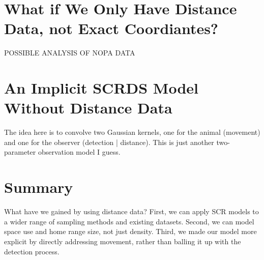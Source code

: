 \section{What if We Only Have Distance Data, not Exact Coordiantes?}


POSSIBLE ANALYSIS OF NOPA DATA





\section{An Implicit SCRDS Model Without Distance Data}

The idea here is to convolve two Gaussian kernels, one for the animal
(movement) and one for the observer (detection | distance). This is
just another two-parameter observation model I guess.



\section{Summary}

What have we gained by using distance data? First, we can apply SCR
models to a wider range of sampling methods and existing
datasets. Second, we can model space use and home range size, not just
density. Third, we made our model more explicit by directly addressing
movement, rather than balling it up with the detection process.